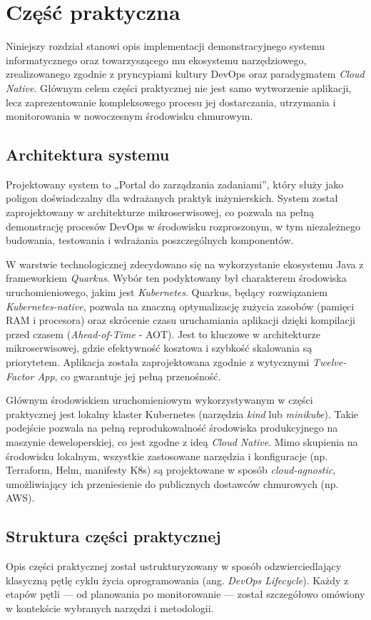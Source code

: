 \newpage
\section{Część praktyczna}
Niniejszy rozdział stanowi opis implementacji demonstracyjnego systemu informatycznego oraz towarzyszącego mu ekosystemu narzędziowego, zrealizowanego zgodnie z pryncypiami kultury DevOps oraz paradygmatem \textit{Cloud Native}. Głównym celem części praktycznej nie jest samo wytworzenie aplikacji, lecz zaprezentowanie kompleksowego procesu jej dostarczania, utrzymania i monitorowania w nowoczesnym środowisku chmurowym.

\subsection{Architektura systemu}
Projektowany system to „Portal do zarządzania zadaniami”, który służy jako poligon doświadczalny dla wdrażanych praktyk inżynierskich. System został zaprojektowany w architekturze mikroserwisowej, co pozwala na pełną demonstrację procesów DevOps w środowisku rozproszonym, w tym niezależnego budowania, testowania i wdrażania poszczególnych komponentów.

W warstwie technologicznej zdecydowano się na wykorzystanie ekosystemu Java z frameworkiem \textit{Quarkus}. Wybór ten podyktowany był charakterem środowiska uruchomieniowego, jakim jest \textit{Kubernetes}. Quarkus, będący rozwiązaniem \textit{Kubernetes-native}, pozwala na znaczną optymalizację zużycia zasobów (pamięci RAM i procesora) oraz skrócenie czasu uruchamiania aplikacji dzięki kompilacji przed czasem (\textit{Ahead-of-Time} - AOT). Jest to kluczowe w architekturze mikroserwisowej, gdzie efektywność kosztowa i szybkość skalowania są priorytetem. Aplikacja została zaprojektowana zgodnie z wytycznymi \textit{Twelve-Factor App}, co gwarantuje jej pełną przenośność.

Głównym środowiskiem uruchomieniowym wykorzystywanym w części praktycznej jest lokalny klaster Kubernetes (narzędzia \textit{kind} lub \textit{minikube}). Takie podejście pozwala na pełną reprodukowalność środowiska produkcyjnego na maszynie deweloperskiej, co jest zgodne z ideą \textit{Cloud Native}. Mimo skupienia na środowisku lokalnym, wszystkie zastosowane narzędzia i konfiguracje (np. Terraform, Helm, manifesty K8s) są projektowane w sposób \textit{cloud-agnostic}, umożliwiający ich przeniesienie do publicznych dostawców chmurowych (np. AWS).

\subsection{Struktura części praktycznej}
Opis części praktycznej został ustrukturyzowany w sposób odzwierciedlający klasyczną pętlę cyklu życia oprogramowania (ang. \textit{DevOps Lifecycle}). Każdy z etapów pętli — od planowania po monitorowanie — został szczegółowo omówiony w kontekście wybranych narzędzi i metodologii.

